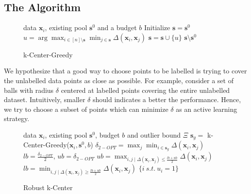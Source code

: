 \documentclass{article}
\begin{document}
\subsection{The Algorithm}
\label{sec:alg}
  \begin{figure}
    \begin{minipage}{0.5\textwidth}
    \vspace{-8mm}
\begin{algorithm}[H]
   \caption{k-Center-Greedy}
      \label{alg:greedy}
\begin{algorithmic}
    data $\mathbf{x}_i$, existing pool $\mathbf{s}^0$ and a budget $b$
    \STATE Initialize $\mathbf{s}=\mathbf{s}^0$
   \REPEAT
   \STATE $u=\arg\max_{i \in [n] \setminus \mathbf{s}} \min_{j \in \mathbf{s}} \Delta(\mathbf{x}_i, \mathbf{x}_j)$
   \STATE $\mathbf{s} = \mathbf{s} \cup \{u\}$
    $\mathbf{s} \setminus \mathbf{s}^0$
\end{algorithmic}
\end{algorithm}
\vspace{-8mm}
    \end{minipage}
  \end{figure}

We hypothesize that a good way to choose points to be labelled is trying to cover the unlabelled data points as close as possible. For example, consider a set of balls with radius $\delta$ centered at labelled points covering the entire unlabelled dataset. Intuitively, smaller $\delta$ should indicates a better the performance. Hence, we try to choose a subset of points which can minimize $\delta$ as an active learning strategy. 
  
    \begin{figure}
    \begin{minipage}{0.5\textwidth}
    \vspace{-8mm}
\begin{algorithm}[H]
   \caption{Robust k-Center}
   \label{alg:bin}
\begin{algorithmic}
    data $\mathbf{x}_i$, existing pool $\mathbf{s}^0$, budget $b$ and outlier bound $\Xi$
    $\mathbf{s}_g =$ k-Center-Greedy($\mathbf{x}_i, \mathbf{s}^0, b$)
   \STATE $\delta_{2-OPT} = \max_j \min_{i \in \mathbf{s}_g} \Delta(\mathbf{x}_i,\mathbf{x}_j)$ 
   \STATE $lb=\frac{\delta_{2-OPT}}{2}$, $ub=\delta_{2-OPT}$
   \REPEAT
   \STATE $ub=\max_{i,j \mid  \Delta(\mathbf{x}_i,\mathbf{x}_j) \leq \frac{lb+ub}{2}}  \Delta(\mathbf{x}_i,\mathbf{x}_j) $
   \ELSE
   \STATE $lb=\min_{i,j \mid   \Delta(\mathbf{x}_i,\mathbf{x}_j) \geq \frac{lb+ub}{2}}  \Delta(\mathbf{x}_i,\mathbf{x}_j) $
    \ENDIF
       $\{i\ s.t.\ u_i=1\}$
\end{algorithmic}
\end{algorithm}
\vspace{-5mm}
    \end{minipage}
  \end{figure}
\end{document}
